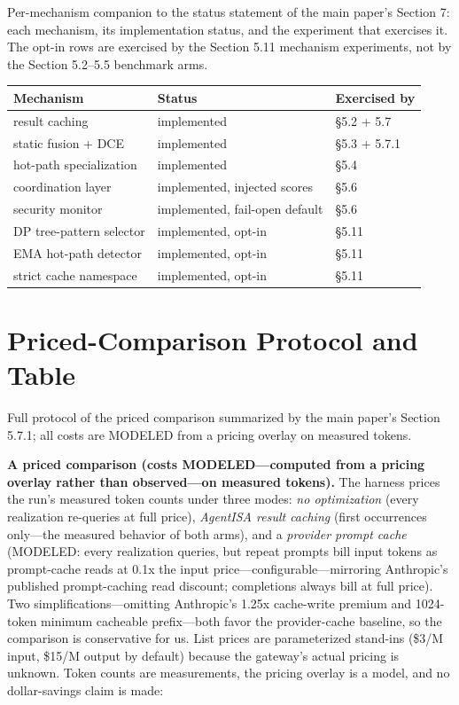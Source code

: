 \documentclass[
  11pt,
]{article}
\newcounter{none} %
\begin{document}
Per-mechanism companion to the status statement of the main paper's
Section 7: each mechanism, its implementation status, and the experiment
that exercises it. The opt-in rows are exercised by the Section 5.11
mechanism experiments, not by the Section 5.2--5.5 benchmark arms.

{\def\LTcaptype{none} %
\begin{longtable}[]{@{}lll@{}}
\toprule\noalign{}
Mechanism & Status & Exercised by \\
\midrule\noalign{}
\endhead
\bottomrule\noalign{}
\endlastfoot
result caching & implemented & §5.2 + 5.7 \\
static fusion + DCE & implemented & §5.3 + 5.7.1 \\
hot-path specialization & implemented & §5.4 \\
coordination layer & implemented, injected scores & §5.6 \\
security monitor & implemented, fail-open default & §5.6 \\
DP tree-pattern selector & implemented, opt-in & §5.11 \\
EMA hot-path detector & implemented, opt-in & §5.11 \\
strict cache namespace & implemented, opt-in & §5.11 \\
\end{longtable}
}

\section{Priced-Comparison Protocol and
Table}\label{priced-comparison-protocol-and-table}

Full protocol of the priced comparison summarized by the main paper's
Section 5.7.1; all costs are MODELED from a pricing overlay on measured
tokens.

\textbf{A priced comparison (costs MODELED---computed from a pricing
overlay rather than observed---on measured tokens).} The harness prices
the run's measured token counts under three modes: \emph{no
optimization} (every realization re-queries at full price),
\emph{AgentISA result caching} (first occurrences only---the measured
behavior of both arms), and a \emph{provider prompt cache} (MODELED:
every realization queries, but repeat prompts bill input tokens as
prompt-cache reads at 0.1x the input price---configurable---mirroring
Anthropic's published prompt-caching read discount; completions always
bill at full price). Two simplifications---omitting Anthropic's 1.25x
cache-write premium and 1024-token minimum cacheable prefix---both favor
the provider-cache baseline, so the comparison is conservative for us.
List prices are parameterized stand-ins (\$3/M input, \$15/M output by
default) because the gateway's actual pricing is unknown. Token counts
are measurements, the pricing overlay is a model, and no dollar-savings
claim is made:
\end{document}
